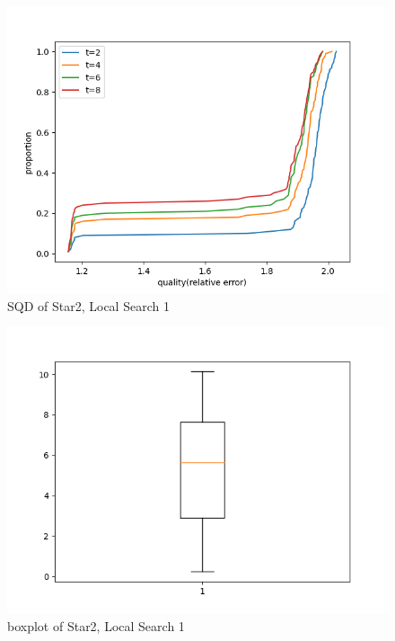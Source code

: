 \documentclass[acmlarge]{acmart}
\begin{document}
\begin{figure}[p]
	\includegraphics[width=\linewidth]{star2_SQD_LS1.png}
	\caption{SQD of Star2, Local Search 1}
\end{figure}

\begin{figure}[p]
	\includegraphics[width=\linewidth]{star2_boxplot_LS1.png}
	\caption{boxplot of Star2, Local Search 1}
\end{figure}

\end{document}
